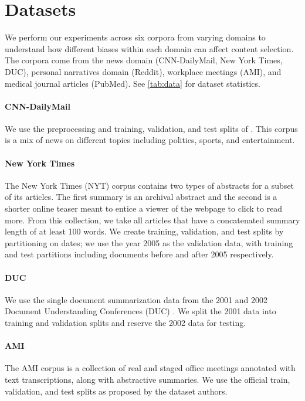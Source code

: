 \section{Datasets}
\label{sec:datasets}

We perform our experiments across six corpora from varying domains to
understand how different biases within each domain can affect content
selection. The corpora come from the news domain (CNN-DailyMail, New York
Times, DUC), personal narratives domain (Reddit), workplace meetings (AMI), and
medical journal articles (PubMed). See \autoref{tab:data} for dataset
statistics.

\paragraph{CNN-DailyMail} We use the preprocessing and training, validation,
and test splits of \citet{see2017}.  This corpus is a mix of news on different
topics including politics, sports, and entertainment.

\paragraph{New York Times}The New York Times (NYT) corpus
\citep{sandhaus2008new} contains two types of abstracts for a subset of its
articles. The first summary is an archival abstract and the second is a shorter
online teaser meant to entice a viewer of the webpage to click to read more.
From this collection, we take all articles that have a concatenated summary
length of at least 100 words.  We create training, validation, and test splits
by partitioning on dates; we use the year 2005 as the validation data, with
training and test partitions including documents before and after 2005
respectively.

\paragraph{DUC} We use the single document summarization data from the 2001 and
2002 Document Understanding Conferences (DUC) \citep{over2002introduction}. We
split the 2001 data into training and validation splits and reserve the 2002
data for testing.



\paragraph{AMI} The AMI corpus \citep{carletta2005ami} is a collection of real
and staged office meetings annotated with text transcriptions, along with
abstractive summaries. We use the official train, validation, and test splits
as proposed by the dataset authors.


